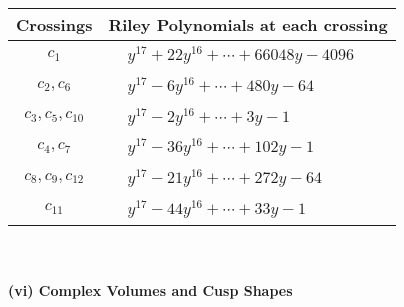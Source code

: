 \documentclass[1p]{elsarticle_modified}
\theoremstyle{definition}
\begin{document}
\begin{tabular}{m{50pt}|m{274pt}}
Crossings & \hspace{64pt}Riley Polynomials at each crossing \\
\hline $$\begin{aligned}c_{1}\end{aligned}$$&$\begin{aligned}
&y^{17}+22 y^{16}+\cdots+66048 y-4096
\end{aligned}$\\
\hline $$\begin{aligned}c_{2},c_{6}\end{aligned}$$&$\begin{aligned}
&y^{17}-6 y^{16}+\cdots+480 y-64
\end{aligned}$\\
\hline $$\begin{aligned}c_{3},c_{5},c_{10}\end{aligned}$$&$\begin{aligned}
&y^{17}-2 y^{16}+\cdots+3 y-1
\end{aligned}$\\
\hline $$\begin{aligned}c_{4},c_{7}\end{aligned}$$&$\begin{aligned}
&y^{17}-36 y^{16}+\cdots+102 y-1
\end{aligned}$\\
\hline $$\begin{aligned}c_{8},c_{9},c_{12}\end{aligned}$$&$\begin{aligned}
&y^{17}-21 y^{16}+\cdots+272 y-64
\end{aligned}$\\
\hline $$\begin{aligned}c_{11}\end{aligned}$$&$\begin{aligned}
&y^{17}-44 y^{16}+\cdots+33 y-1
\end{aligned}$\\
\hline
\end{tabular}\\~\\
\newpage\flushleft \textbf{(vi) Complex Volumes and Cusp Shapes}
\end{document}
